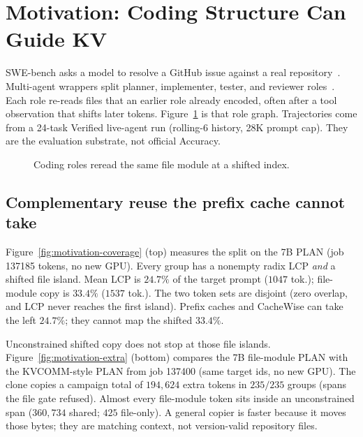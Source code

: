 \section{Motivation: Coding Structure Can Guide KV}
\label{sec:motivation}

SWE-bench asks a model to resolve a GitHub issue against a real
repository~\cite{swebench}. Multi-agent wrappers split planner,
implementer, tester, and reviewer roles~\cite{multiagent2025,llmagents2024}.
Each role re-reads files that an earlier role already encoded, often
after a tool observation that shifts later tokens.
Figure~\ref{fig:dag-example} is that role graph. Trajectories come from
a 24-task Verified live-agent run (rolling-6 history, 28K prompt cap).
They are the evaluation substrate, not official Accuracy.

\begin{figure}[ht]
\centering
\resizebox{\columnwidth}{!}{}
\caption{Coding roles reread the same file module at a shifted index.}
\label{fig:dag-example}
\end{figure}

\subsection{Complementary reuse the prefix cache cannot take}

Figure~\ref{fig:motivation-coverage} (top) measures the split on the 7B
PLAN (job 137185 tokens, no new GPU). Every group has a nonempty radix
LCP \emph{and} a shifted file island. Mean LCP is $24.7\%$ of the
target prompt ($1047$ tok.); file-module copy is $33.4\%$ ($1537$ tok.).
The two token sets are disjoint (zero overlap, and LCP never reaches
the first island). Prefix caches and CacheWise can take the left
$24.7\%$; they cannot map the shifted $33.4\%$.

Unconstrained shifted copy does not stop at those file islands.
Figure~\ref{fig:motivation-extra} (bottom) compares the 7B file-module
PLAN with the KVCOMM-style PLAN from job 137400 (same target ids, no
new GPU). The clone copies a campaign total of $194{,}624$ extra tokens
in $235/235$ groups (spans the file gate refused). Almost every
file-module token sits inside an unconstrained span ($360{,}734$
shared; $425$ file-only). A general copier is faster because it moves
those bytes; they are matching context, not version-valid repository
files.

